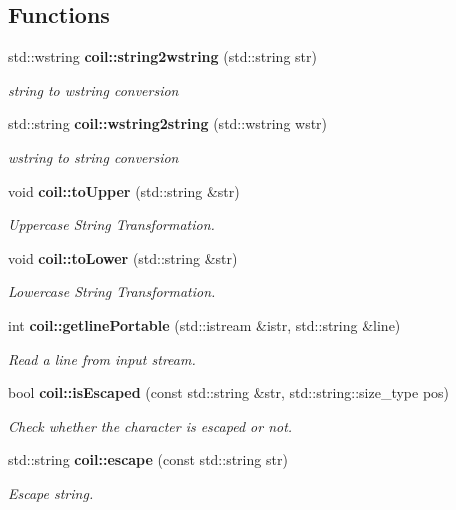 \subsection*{Functions}
\begin{DoxyCompactItemize}
\item 
std::wstring {\bf coil::string2wstring} (std::string str)
\begin{DoxyCompactList}\small\item\em string to wstring conversion \item\end{DoxyCompactList}\item 
std::string {\bf coil::wstring2string} (std::wstring wstr)
\begin{DoxyCompactList}\small\item\em wstring to string conversion \item\end{DoxyCompactList}\item 
void {\bf coil::toUpper} (std::string \&str)
\begin{DoxyCompactList}\small\item\em Uppercase String Transformation. \item\end{DoxyCompactList}\item 
void {\bf coil::toLower} (std::string \&str)
\begin{DoxyCompactList}\small\item\em Lowercase String Transformation. \item\end{DoxyCompactList}\item 
int {\bf coil::getlinePortable} (std::istream \&istr, std::string \&line)
\begin{DoxyCompactList}\small\item\em Read a line from input stream. \item\end{DoxyCompactList}\item 
bool {\bf coil::isEscaped} (const std::string \&str, std::string::size\_\-type pos)
\begin{DoxyCompactList}\small\item\em Check whether the character is escaped or not. \item\end{DoxyCompactList}\item 
std::string {\bf coil::escape} (const std::string str)
\begin{DoxyCompactList}\small\item\em Escape string. \item\end{DoxyCompactList}\item 

\end{DoxyCompactItemize}
